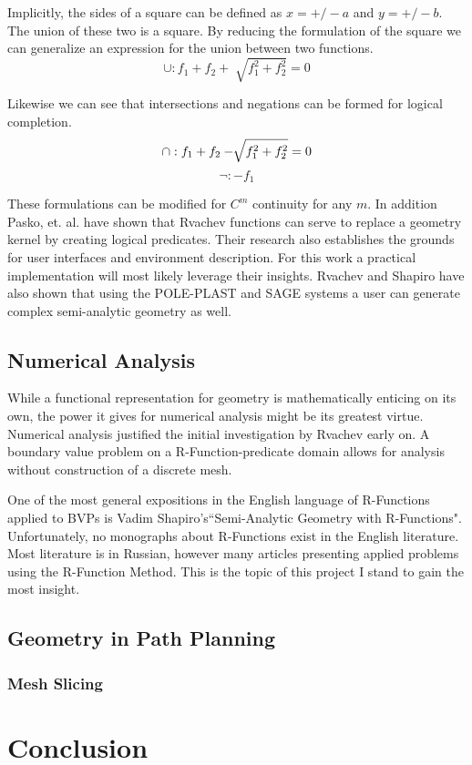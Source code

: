 \documentclass[a4paper]{article}
\begin{document}
Implicitly, the sides of a square can be defined as $x= +/- a$ and $y= +/- b$.
The union of these two is a square. By reducing the formulation of the square
we can generalize an expression for the union between two functions.
\begin{equation*}
\cup : f_1 + f_2 + \sqrt[]{f_1^2 +f_2^2} =0
\end{equation*}

Likewise we can see that intersections and negations can be formed for logical
completion.
\begin{equation*}
\cap : f_1 + f_2 - \sqrt[]{f_1^2 +f_2^2} =0 \\
\end{equation*}
\begin{equation*}
\neg : -f_1
\end{equation*}

These formulations can be modified for $C^m$ continuity for any $m$.
\cite{shapiro2007semi} In addition Pasko, et. al. have shown that Rvachev
functions can serve to replace a geometry kernel by creating logical
predicates. \cite{pasko1995function} Their research also establishes the
grounds for user interfaces and environment description. For this work a
practical implementation will most likely leverage their insights.
Rvachev and Shapiro have also shown that using the POLE-PLAST and SAGE
systems a user can generate complex semi-analytic geometry
as well.\cite{rvachev2000completeness} 
\subsection{Numerical Analysis}
While a functional representation for geometry is mathematically enticing on
its own, the power it gives for numerical analysis might be its greatest
virtue. Numerical analysis justified the initial investigation by Rvachev
early on. A boundary value problem on a R-Function-predicate domain allows
for analysis without construction of a discrete mesh.\cite{rvachev2000completeness}

One of the most general expositions in the English language of R-Functions
applied to BVPs is
Vadim Shapiro's``Semi-Analytic Geometry with R-Functions". \cite{shapiro2007semi}
Unfortunately, no monographs about R-Functions exist in the English literature.
Most literature is in Russian, however many articles presenting applied
problems using the R-Function Method. \cite{voron2010} This is the topic
of this project I stand to gain the most insight.


\subsection{Geometry in Path Planning}

\subsubsection{Mesh Slicing}


\section{Conclusion}



\end{document}
